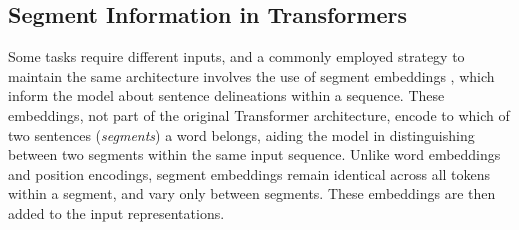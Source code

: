 







\subsection{Segment Information in Transformers}

Some tasks require different inputs, and a commonly employed strategy to maintain the same architecture involves the use of segment embeddings \citep{devlin2018bert}, which inform the model about sentence delineations within a sequence. These embeddings, not part of the original Transformer architecture, encode to which of two sentences (\textit{segments}) a word belongs, aiding the model in distinguishing between two segments within the same input sequence. 
Unlike word embeddings and position encodings, segment embeddings remain identical across all tokens within a segment, and vary only between segments. These embeddings are then added to the input representations.

